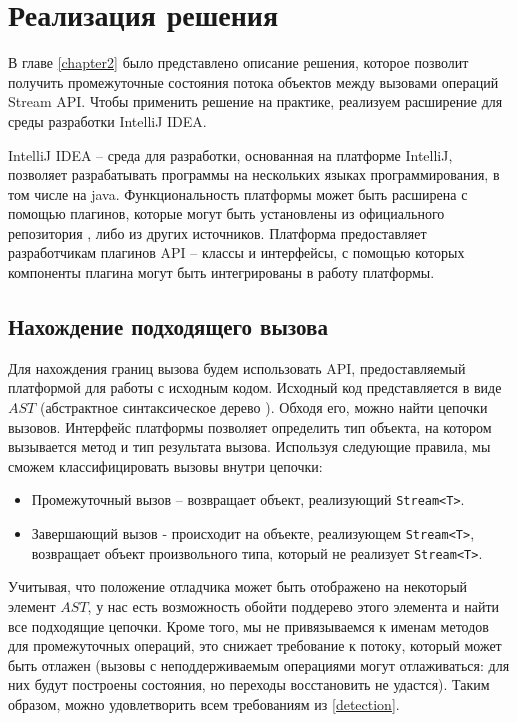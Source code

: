 \section{Реализация решения}\label{chapter3}

В главе \ref{chapter2} было представлено описание решения, которое позволит получить промежуточные состояния потока объектов между вызовами операций Stream API. Чтобы применить решение на практике, реализуем расширение для среды разработки IntelliJ IDEA. 

IntelliJ IDEA -- среда для разработки, основанная на платформе IntelliJ, позволяет разрабатывать программы на нескольких языках программирования, в том числе на java. Функциональность платформы может быть расширена с помощью плагинов, которые могут быть установлены из официального репозитория \cite{jb:plugins}, либо из других источников. Платформа предоставляет разработчикам плагинов API -- классы и интерфейсы, с помощью которых компоненты плагина могут быть интегрированы в работу платформы.
\subsection{Нахождение подходящего вызова}

Для нахождения границ вызова будем использовать API, предоставляемый платформой для работы с исходным кодом. Исходный код представляется в виде $AST$ (абстрактное синтаксическое дерево \cite{wiki:ast}). Обходя его, можно найти цепочки вызовов. Интерфейс платформы позволяет определить тип объекта, на котором вызывается метод и тип результата вызова. Используя следующие правила, мы сможем классифицировать вызовы внутри цепочки:
\begin{itemize}
	\item Промежуточный вызов -- возвращает объект, реализующий \texttt{Stream<T>}.
	\item Завершающий вызов - происходит на объекте, реализующем \texttt{Stream<T>}, возвращает объект произвольного типа, который не реализует \texttt{Stream<T>}. 
\end{itemize}

Учитывая, что положение отладчика может быть отображено на некоторый элемент $AST$, у нас есть возможность обойти поддерево этого элемента и найти все подходящие цепочки. Кроме того, мы не привязываемся к именам методов для промежуточных операций, это снижает требование к потоку, который может быть отлажен (вызовы с неподдерживаемым операциями могут отлаживаться: для них будут построены состояния, но переходы восстановить не удастся). Таким образом, можно удовлетворить всем требованиям из \ref{detection}.

